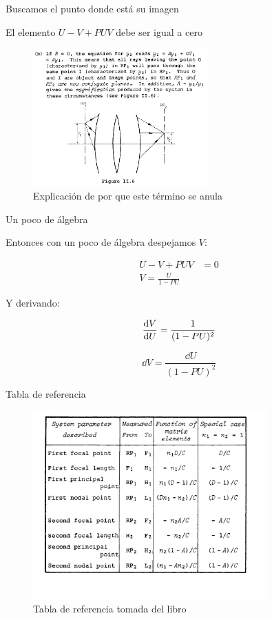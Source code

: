 \documentclass{beamer}
\begin{document}
  \begin{frame}{Buscamos el punto donde está su imagen}
  
    El elemento $U-V+PUV$ debe ser igual a cero

    \begin{figure}
      \includegraphics[width=0.6\textwidth]{Figures/B0.png}
      \caption{Explicación de por que este término se anula}
    \end{figure}
  
  \end{frame}

  \begin{frame}{Un poco de álgebra}
  
    Entonces con un poco de álgebra despejamos $V$:

    \begin{align*}
      U-V+PUV&=0\\
      V=\frac{U}{1-PU}
    \end{align*}

    Y derivando:

    \begin{equation}
      \dv{V}{U}=\frac{1}{(1-PU)^2}
    \end{equation}
  
    \begin{equation}
      \dd V=\frac{\dd U}{(1-PU)^2}
    \end{equation}

  \end{frame}

  \begin{frame}{Tabla de referencia}
  
    \begin{figure}
      \includegraphics[width=0.8\textwidth]{Figures/TableBook.png}
      \caption{Tabla de referencia tomada del libro}
      \label{fig:Ref}
    \end{figure}
  
  \end{frame}
  
\end{document}
